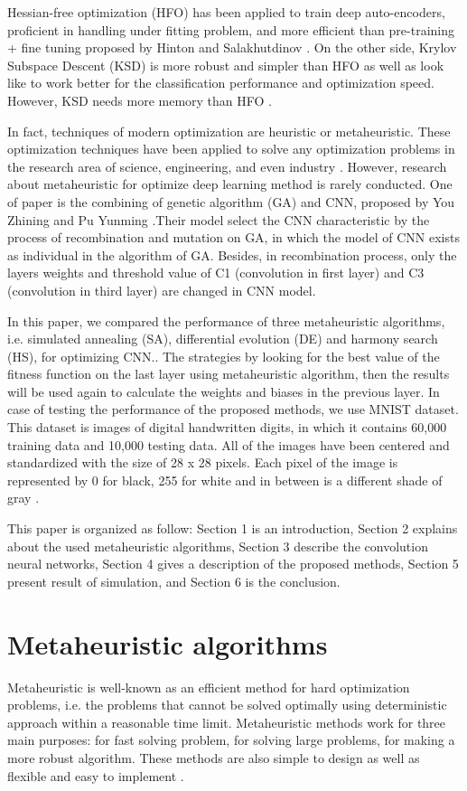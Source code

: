 \documentclass[10pt,letterpaper]{article}
\begin{document}
Hessian-free optimization (HFO) has been applied to train deep auto-encoders\cite{Martens}, proficient in handling under fitting problem, and more efficient than pre-training + fine tuning proposed by Hinton and Salakhutdinov \cite{Hinton}. On the other side, Krylov Subspace Descent (KSD) is more robust and simpler than HFO as well as look like to work better for the classification performance and optimization speed. However, KSD needs more memory than HFO \cite{Vinyal}.

In fact, techniques of modern optimization are heuristic or metaheuristic. These optimization techniques have been applied to solve any optimization problems in the research area of science, engineering, and even industry \cite{Yang}. However, research about metaheuristic for optimize deep learning method is rarely conducted. One of paper is the combining of genetic algorithm (GA) and CNN, proposed by You Zhining and Pu Yunming \cite{You}.Their model select the CNN characteristic by the process of recombination and mutation on GA, in which the model of CNN exists as individual in the algorithm of GA. Besides, in recombination process, only the layers weights and threshold value of C1 (convolution in first layer)  and C3 (convolution in third layer) are changed in CNN model.

In this paper, we compared the performance of three metaheuristic algorithms, i.e. simulated annealing (SA), differential evolution (DE) and harmony search (HS), for optimizing CNN.. The strategies by looking for the best value of the fitness  function on the last layer using metaheuristic algorithm, then the results will be used again to calculate the weights and biases in the previous layer. In case of testing the performance of the proposed methods, we use MNIST dataset. This dataset is images of digital handwritten digits, in which it contains 60,000 training data and 10,000 testing data. All of the images have been centered and standardized with the size of 28 x 28 pixels. Each pixel of the image is represented by 0 for black, 255 for white and in between is a different shade of gray \cite{LISA}. 

This paper is organized as follow:  Section 1 is an introduction, Section 2 explains about the used metaheuristic algorithms, Section 3 describe the convolution neural networks, Section 4 gives a description of the proposed methods, Section 5 present result of simulation, and Section 6 is the conclusion.


\section{Metaheuristic algorithms}
Metaheuristic is well-known as an efficient method for hard optimization problems, i.e.  the problems that cannot be solved optimally using deterministic approach within a reasonable time limit. Metaheuristic methods work for three main purposes: for fast solving problem, for solving large problems, for making a more robust algorithm. These methods are also simple to design as well as flexible and easy to implement \cite{Talbi}. 
\end{document}
